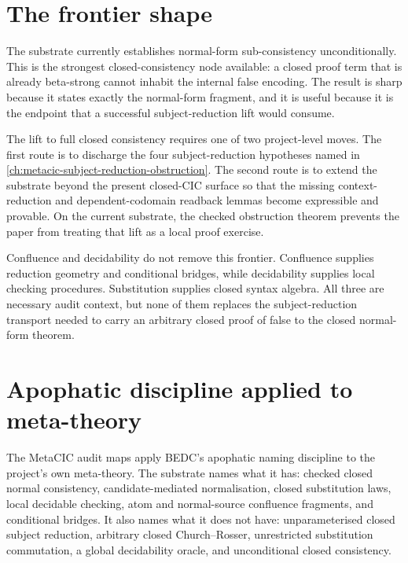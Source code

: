 

\section{The frontier shape}
\label{sec:metacic-audit-synthesis-frontier-shape}

The substrate currently establishes normal-form sub-consistency
unconditionally. This is the strongest closed-consistency node available: a
closed proof term that is already beta-strong cannot inhabit the internal false
encoding. The result is sharp because it states exactly the normal-form
fragment, and it is useful because it is the endpoint that a successful
subject-reduction lift would consume.

The lift to full closed consistency requires one of two project-level moves.
The first route is to discharge the four subject-reduction hypotheses named in
\autoref{ch:metacic-subject-reduction-obstruction}. The second route is to
extend the substrate beyond the present closed-CIC surface so that the missing
context-reduction and dependent-codomain readback lemmas become expressible and
provable. On the current substrate, the checked obstruction theorem prevents
the paper from treating that lift as a local proof exercise.

Confluence and decidability do not remove this frontier. Confluence supplies
reduction geometry and conditional bridges, while decidability supplies local
checking procedures. Substitution supplies closed syntax algebra. All three are
necessary audit context, but none of them replaces the subject-reduction
transport needed to carry an arbitrary closed proof of false to the closed
normal-form theorem.

\section{Apophatic discipline applied to meta-theory}
\label{sec:metacic-audit-synthesis-apophatic}

The MetaCIC audit maps apply BEDC's apophatic naming discipline to the
project's own meta-theory. The substrate names what it has: checked closed
normal consistency, candidate-mediated normalisation, closed substitution
laws, local decidable checking, atom and normal-source confluence fragments, and
conditional bridges. It also names what it does not have: unparameterised closed
subject reduction, arbitrary closed Church--Rosser, unrestricted substitution
commutation, a global decidability oracle, and unconditional closed
consistency.

